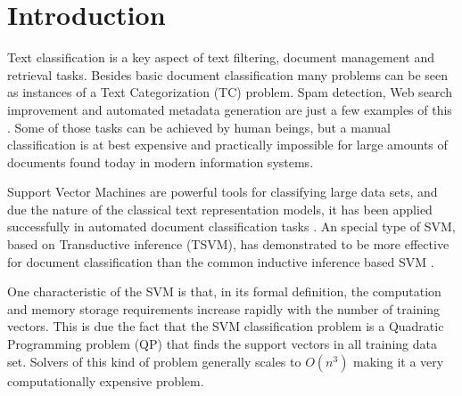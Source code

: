 \section{Introduction}

Text classification is a key aspect of text filtering, document management
and retrieval tasks. Besides basic document classification many problems can be seen as instances of
a Text Categorization (TC) problem. Spam detection, Web search
improvement and automated metadata generation are just a few examples
of this \cite{Sebastiani02}.  Some of those tasks can be achieved
by human beings, but a manual classification is at best expensive
and practically impossible for large amounts of documents found today
in modern information systems.


Support Vector Machines \cite{Vapnik98} are powerful tools for classifying
large data sets, and due the nature of the classical text representation
models, it has been applied successfully in automated document classification
tasks \cite{Joachims98,Joachims99c}. An special type of SVM, based
on Transductive inference (TSVM), has demonstrated to be more effective
for document classification than the common inductive inference based
SVM \cite{Joachims99c}.

One characteristic of the SVM is that, in its formal definition, the
computation and memory storage requirements increase rapidly with
the number of training vectors. This is due the fact that the SVM
classification problem is a Quadratic Programming problem (QP) that
finds the support vectors in all training data set. Solvers of this
kind of problem generally scales to $O(n^{3})$ making it a very computationally
expensive problem.


